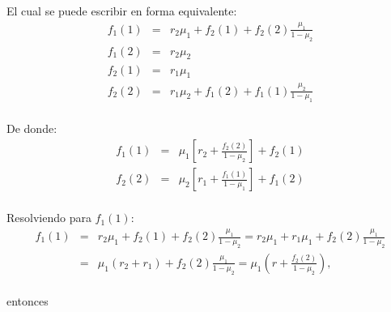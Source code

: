 \documentclass{article}
\numberwithin{equation}{section}
\begin{document}
El cual se puede escribir en forma equivalente:
\begin{eqnarray*}
f_{1}\left(1\right)&=&r_{2}\mu_{1}+f_{2}\left(1\right)+f_{2}\left(2\right)\frac{\mu_{1}}{1-\mu_{2}}\\
f_{1}\left(2\right)&=&r_{2}\mu_{2}\\
f_{2}\left(1\right)&=&r_{1}\mu_{1}\\
f_{2}\left(2\right)&=&r_{1}\mu_{2}+f_{1}\left(2\right)+f_{1}\left(1\right)\frac{\mu_{2}}{1-\mu_{1}}\\
\end{eqnarray*}

De donde:
\begin{eqnarray*}
f_{1}\left(1\right)&=&\mu_{1}\left[r_{2}+\frac{f_{2}\left(2\right)}{1-\mu_{2}}\right]+f_{2}\left(1\right)\\
f_{2}\left(2\right)&=&\mu_{2}\left[r_{1}+\frac{f_{1}\left(1\right)}{1-\mu_{1}}\right]+f_{1}\left(2\right)\\
\end{eqnarray*}

Resolviendo para $f_{1}\left(1\right)$:
\begin{eqnarray*}
f_{1}\left(1\right)&=&r_{2}\mu_{1}+f_{2}\left(1\right)+f_{2}\left(2\right)\frac{\mu_{1}}{1-\mu_{2}}=r_{2}\mu_{1}+r_{1}\mu_{1}+f_{2}\left(2\right)\frac{\mu_{1}}{1-\mu_{2}}\\
&=&\mu_{1}\left(r_{2}+r_{1}\right)+f_{2}\left(2\right)\frac{\mu_{1}}{1-\mu_{2}}=\mu_{1}\left(r+\frac{f_{2}\left(2\right)}{1-\mu_{2}}\right),\\
\end{eqnarray*}

entonces
\end{document}
